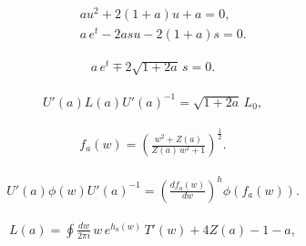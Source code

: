 \documentclass[]{article}
\begin{document}
\begin{eqnarray}
	\label{Eq:stu1}
	&& au^2+2(1+a)u+a=0, \\
	\label{Eq:stu2}
	&& a\,e^t-2a su -2(1+a) s =0.
\end{eqnarray}

\begin{eqnarray}
	\label{Eq:stu3}
	a\,e^t \mp 2\sqrt{1+2a}\,s=0.
\end{eqnarray}

\begin{eqnarray}
	\label{Eq:Ldiag}
	U'(a)L(a)U'(a)^{-1}=\sqrt{1+2a}\,L_0,
\end{eqnarray}



\begin{eqnarray}
	\label{Eq:fa}
	f_a(w)=\left(\frac{w^2+Z(a)}{Z(a)\,w^2+1}\right)^{\frac{1}{2}}.
\end{eqnarray}

\begin{eqnarray}
	U'(a)\phi(w)U'(a)^{-1} = \left(\frac{df_a(w)}{dw}\right)^h
	\phi\left(f_a(w)\right).
\end{eqnarray}

\begin{eqnarray}
	\label{Eq:LT}
	L(a)=\oint \frac{dw}{2\pi i}\,w\,e^{h_a(w)}\,T'(w)
	+4Z(a)-1-a,
\end{eqnarray}
\end{document}
